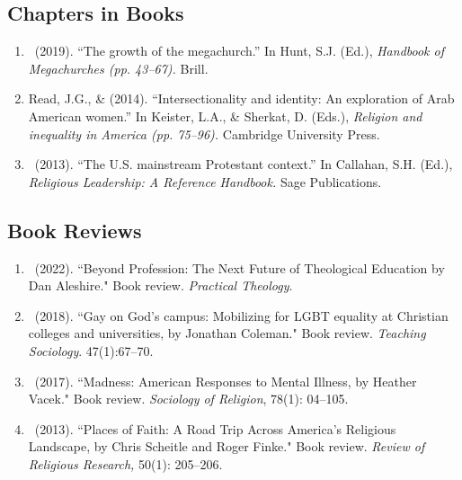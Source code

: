\subsection*{Chapters in Books}
\begin{enumerate} 
\item \Eagle\ (2019). ``The growth of the megachurch.'' In Hunt, S.J. (Ed.), \emph{Handbook of Megachurches (pp. 43--67).} Brill.

\item Read, J.G., \& \Eagle \hspace{.01em}  (2014). ``Intersectionality and identity: An exploration of Arab American women.'' In Keister, L.A., \& Sherkat, D. (Eds.), \emph{Religion and inequality in America (pp. 75--96).} Cambridge University Press.

\item \Eagle\ (2013). ``The U.S. mainstream Protestant context.'' In Callahan, S.H. (Ed.), \emph{Religious Leadership: A Reference Handbook.} Sage Publications.
\end{enumerate}

\subsection*{Book Reviews}
\begin{enumerate} 
\item \Eagle\  (2022). ``Beyond Profession: The Next Future of Theological Education by Dan Aleshire." Book review.  \emph{Practical Theology}. 
	
\item \Eagle\  (2018). ``Gay on God’s campus: Mobilizing for LGBT equality at Christian colleges and universities, by Jonathan Coleman." Book review. \emph{Teaching Sociology}. 47(1):67--70. 

\item \Eagle\ (2017). ``Madness: American Responses to Mental Illness, by Heather Vacek." Book review. \emph{Sociology of Religion}, 78(1): 04--105. 

\item \Eagle\ (2013). ``Places of Faith: A Road Trip Across America's Religious Landscape, by Chris Scheitle and Roger Finke." Book review.  \emph{Review of Religious Research,} 50(1): 205--206. 
\end{enumerate}


